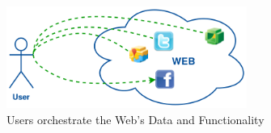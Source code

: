 \begin{figure}[!ht]
  \centering
  \includegraphics[width=0.7\textwidth]{figures/UsersWeildServicesInTheWeb}
  \caption{Users orchestrate the Web's Data and Functionality}
  \label{fig:UsersWeildServicesInTheWeb}
\end{figure}



